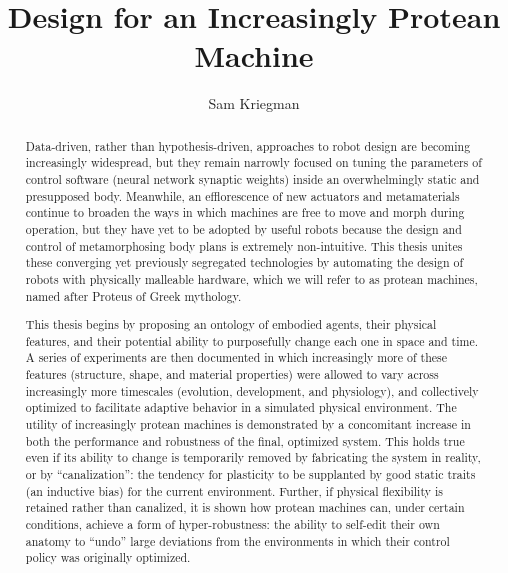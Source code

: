 \documentclass[12pt]{report}
\title{Design for an Increasingly Protean Machine}
\author{Sam Kriegman}
\begin{document}
\maketitle



\begin{abstract}
	
\vspace{10mm}


Data-driven, rather than hypothesis-driven, 
approaches to robot design are becoming increasingly widespread, but they remain narrowly focused on tuning the parameters of control software (neural network synaptic weights) inside an overwhelmingly static and presupposed body.
Meanwhile, an efflorescence of new actuators and metamaterials continue to 
broaden the ways
in which machines are free to 
move and morph
during operation, 
but they have yet to be adopted by useful robots because 
the design and control of 
metamorphosing body plans 
is extremely
non-intuitive.
This thesis unites these 
converging yet previously 
segregated
technologies
by automating the design of robots with physically malleable hardware,
which we will refer to as protean machines, named after Proteus
of Greek mythology.

This thesis begins by proposing an ontology of embodied agents, their physical features, and their potential ability to purposefully change each one in space and time.
A series of experiments are then documented in which increasingly more of these features (structure, shape, and material properties) were allowed to vary across increasingly more timescales (evolution, development, and physiology), and collectively optimized to facilitate 
adaptive
behavior in a simulated physical environment.
The utility of increasingly protean machines is demonstrated by a concomitant increase in both the performance and robustness of the final, optimized system.
This holds true even if its ability to change is temporarily removed by fabricating the system in reality, or by ``canalization'': the tendency for plasticity to be supplanted by good static traits (an inductive bias) for the current environment.
Further, if physical flexibility is retained rather than canalized, it is shown how protean machines can, under certain conditions, achieve a form of hyper-robustness: the ability to self-edit their own anatomy to ``undo'' large deviations from the environments in which their control policy was originally optimized.


\end{abstract}
\end{document}
